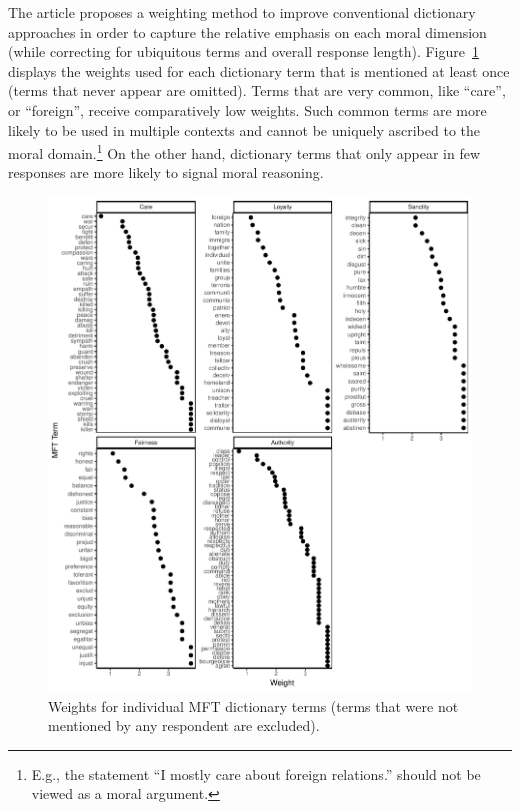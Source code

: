 \documentclass[12pt]{article}
\begin{document}
The article proposes a weighting method to improve conventional dictionary approaches in order to capture the relative emphasis on each moral dimension (while correcting for ubiquitous terms and overall response length). Figure~\ref{fig:mft_weights} displays the weights used for each dictionary term that is mentioned at least once (terms that never appear are omitted). Terms that are very common, like ``care'', or ``foreign'', receive comparatively low weights. Such common terms are more likely to be used in multiple contexts and cannot be uniquely ascribed to the moral domain.\footnote{E.g., the statement ``I mostly care about foreign relations.'' should not be viewed as a moral argument.} On the other hand, dictionary terms that only appear in few responses are more likely to signal moral reasoning.

\begin{figure}[ht]\centering
\includegraphics{../calc/fig/app_mftweights.pdf}
\caption{Weights for individual MFT dictionary terms (terms that were not mentioned by any respondent are excluded).}\label{fig:mft_weights}
\end{figure}
\end{document}
